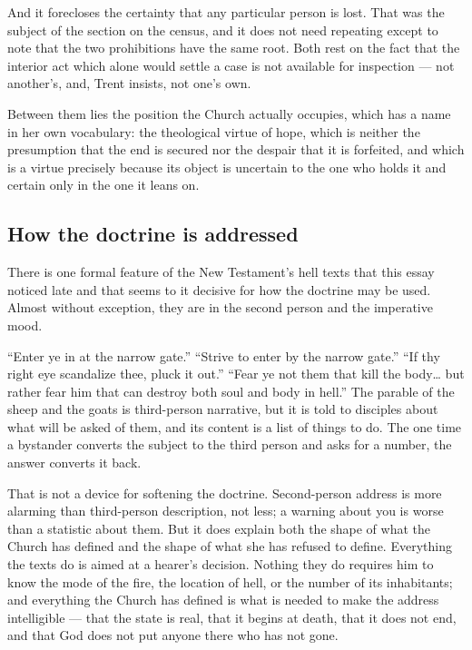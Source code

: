 And it forecloses the certainty that any particular person is lost. That was the subject of the section on the census, and it does not need repeating except to note that the two prohibitions have the same root. Both rest on the fact that the interior act which alone would settle a case is not available for inspection --- not another's, and, Trent insists, not one's own.

Between them lies the position the Church actually occupies, which has a name in her own vocabulary: the theological virtue of hope, which is neither the presumption that the end is secured nor the despair that it is forfeited, and which is a virtue precisely because its object is uncertain to the one who holds it and certain only in the one it leans on.

\subsection{How the doctrine is addressed}

There is one formal feature of the New Testament's hell texts that this essay noticed late and that seems to it decisive for how the doctrine may be used. Almost without exception, they are in the second person and the imperative mood.

``Enter ye in at the narrow gate.'' ``Strive to enter by the narrow gate.'' ``If thy right eye scandalize thee, pluck it out.'' ``Fear ye not them that kill the body\ldots{} but rather fear him that can destroy both soul and body in hell.'' The parable of the sheep and the goats is third-person narrative, but it is told to disciples about what will be asked of them, and its content is a list of things to do. The one time a bystander converts the subject to the third person and asks for a number, the answer converts it back.

That is not a device for softening the doctrine. Second-person address is more alarming than third-person description, not less; a warning about you is worse than a statistic about them. But it does explain both the shape of what the Church has defined and the shape of what she has refused to define. Everything the texts do is aimed at a hearer's decision. Nothing they do requires him to know the mode of the fire, the location of hell, or the number of its inhabitants; and everything the Church has defined is what is needed to make the address intelligible --- that the state is real, that it begins at death, that it does not end, and that God does not put anyone there who has not gone.

